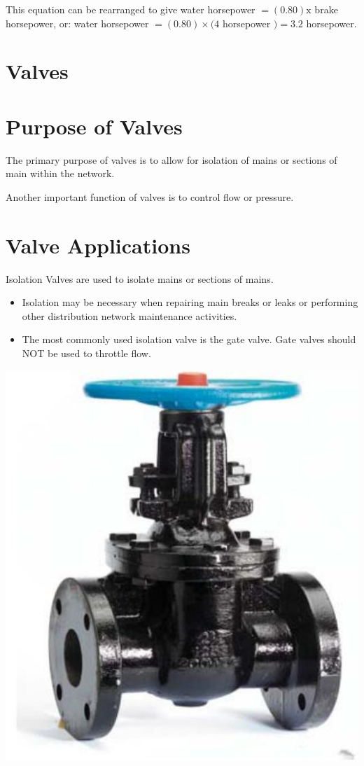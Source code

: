 \documentclass[10pt]{article}
\begin{document}
This equation can be rearranged to give water horsepower $=(0.80) \mathrm{x}$ brake horsepower, or: water horsepower $=(0.80) \times(4$ horsepower $)=3.2$ horsepower.

\section{Valves}
\section{Purpose of Valves}
The primary purpose of valves is to allow for isolation of mains or sections of main within the network.

Another important function of valves is to control flow or pressure.

\section{Valve Applications}
Isolation Valves are used to isolate mains or sections of mains.

\begin{itemize}
  \item Isolation may be necessary when repairing main breaks or leaks or performing other distribution network maintenance activities.

  \item The most commonly used isolation valve is the gate valve. Gate valves should NOT be used to throttle flow.

\end{itemize}
\includegraphics[max width=\textwidth]{GateValve}
\end{document}
